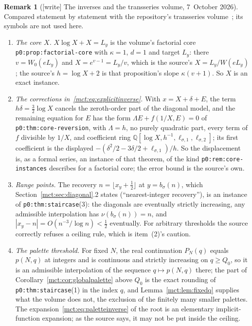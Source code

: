 \documentclass[11pt]{article}
\theoremstyle{definition}
\newtheorem{remark}[theorem]{Remark}
\newcommand{\file}[1]{\nolinkurl{#1}}
\begin{document}
\begin{remark}[{[write]} The inverses and the transseries volume, 7~October 2026]\label{mct:rem:transseries}
Compared statement by statement with the repository's transseries
volume~\cite{TSvol}; its symbols are not used here.
\begin{enumerate}\raggedright
\item \emph{The core $X$.} $X\log X+X=L_y$ is the volume's factorial core \file{p0:prop:factorial-core} with $\kappa=1$, $d=1$ and target $L_y$: there $v=W_0(eL_y)$ and $X=e^{v-1}=L_y/v$, which is the source's $X=L_y/W(eL_y)$; the source's $h=\log X+2$ is that proposition's slope $\kappa(v+1)$. So $X$ is an exact instance.
\item \emph{The corrections in~\eqref{mct:eq:explicitinverse}.} With $x=X+\delta+E$, the term $h\delta=\frac32\log X$ cancels the zeroth-order part of the diagonal model, and the remaining equation for $E$ has the form $\Lambda E+f(1/X,E)=0$ of \file{p0:thm:core-reversion}, with $\Lambda=h$, no purely quadratic part, every term of $f$ divisible by $1/X$, and coefficient ring $\mathbb Q[\log X,h^{-1},\ell_{\sigma,1},\ell_{\sigma,2}]$; its first coefficient is the displayed $-(\delta^2/2-3\delta/2+\ell_{\sigma,1})/h$. So the displacement is, as a formal series, an instance of that theorem, of the kind \file{p0:rem:core-instances} describes for a factorial core; the error bound is the source's own.
\item \emph{Range points.} The recovery $n=\lfloor x_y+\frac12\rfloor$ at $y=b_\sigma(n)$, which Section~\ref{mct:sec:diagonal}.2 states (``nearest-integer recovery''), is an instance of \file{p0:thm:staircase}(3): the diagonals are eventually strictly increasing, any admissible interpolation has $\nu(b_\sigma(n))=n$, and $|x_y-n|=O(n^{-3}/\log n)<\frac12$ eventually. For arbitrary thresholds the source correctly refuses a ceiling rule, which is item~(2)'s caution.
\item \emph{The palette threshold.} For fixed $N$, the real continuation $P_N(q)$ equals $p(N,q)$ at integers and is continuous and strictly increasing on $q\ge Q_0$, so it is an admissible interpolation of the sequence $q\mapsto p(N,q)$ there; the part of Corollary~\ref{mct:cor:globalpalette} above $Q_0$ is the exact rounding of \file{p0:thm:staircase}(1) in the index $q$, and Lemma~\ref{mct:lem:fixedq} supplies what the volume does not, the exclusion of the finitely many smaller palettes. The expansion~\eqref{mct:eq:paletteinverse} of the root is an elementary implicit-function expansion; as the source says, it may not be put inside the ceiling.
\end{enumerate}
\end{remark}
\end{document}
